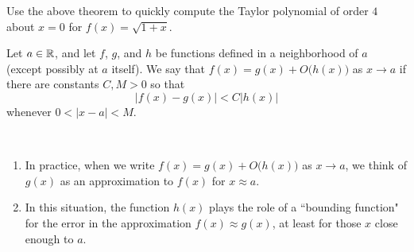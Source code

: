 \begin{example}
Use the above theorem to quickly compute the Taylor polynomial of order $4$ about $x=0$ for $f(x)=\sqrt{1+x}$.
\end{example}
\ifdefined\SOLUTION
{}
\else
\fi
\newpage

\begin{definition}
Let $a\in\mathbb R$, and let $f$, $g$, and $h$ be functions defined in a neighborhood of $a$ (except possibly at $a$ itself).
We say that $f(x) = g(x) + O\big(h(x)\big)$ as $x\to a$ if there are constants $C, M>0$ so that
\begin{equation*}
\left|f(x) - g(x)\right| < C|h(x)|
\end{equation*}
whenever $0 < |x-a| < M$.
\end{definition}

\begin{remark}\,
\begin{enumerate}
\item In practice, when we write $f(x) = g(x) + O\big(h(x)\big)$ as $x\to a$, we think of $g(x)$ as an approximation to $f(x)$ for $x\approx a$.
\item In this situation, the function $h(x)$ plays the role of a ``bounding function" for the error in the approximation $f(x)\approx g(x)$, at least for those $x$ close enough to $a$.
\end{enumerate}
\end{remark}

